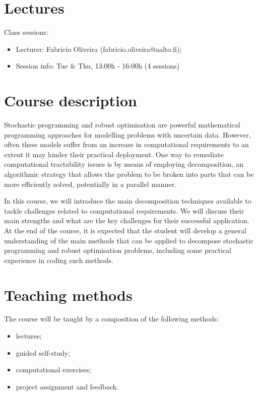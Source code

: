 \documentclass[a4paper]{artikel3}
\begin{document}
\vspace{-10pt}

\section{Lectures}

Class sessions: 
\begin{itemize}
    \item Lecturer: Fabricio Oliveira (fabricio.oliveira@aalto.fi);
    \item Session info: Tue \& Thu, 13:00h - 16:00h (4 sessions)
\end{itemize}


\vspace{-18pt}
\section{Course description}

Stochastic programming and robust optimisation are powerful mathematical programming approaches for modelling problems with uncertain data. However, often these models suffer from an increase in computational requirements to an extent it may hinder their practical deployment. One way to remediate computational tractability issues is by means of employing decomposition, an algorithmic strategy that allows the problem to be broken into parts that can be more efficiently solved, potentially in a parallel manner.

In this course, we will introduce the main decomposition techniques available to tackle challenges related to computational requirements. We will discuss their main strengths and what are the key challenges for their successful application. At the end of the course, it is expected that the student will develop a general understanding of the main methods that can be applied to decompose stochastic programming and robust optimisation problems, including some practical experience in coding such methods.

\vspace{-18pt}
\section{Teaching methods}

The course will be taught by a composition of the following methods: 
\begin{itemize}
    \item lectures;
    \item guided self-study;
    \item computational exercises;
    \item project assignment and feedback.  
\end{itemize}
\end{document}
